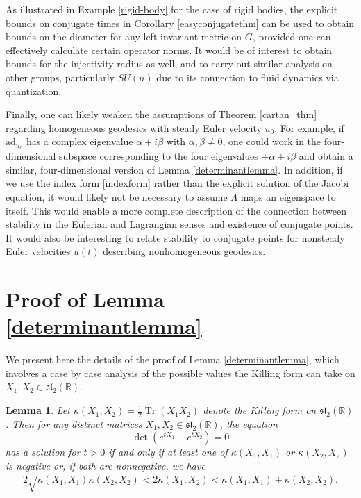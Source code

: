 \documentclass[oneside, 11pt]{amsart}
\newtheorem{lemma}[theorem]{Lemma}
\numberwithin{equation}{section}
\DeclareMathOperator{\Tr}{Tr}
\newcommand{\ad}{\mathrm{ad}}
\newcommand{\simpkill}{\kappa}
\newcommand{\mattyone}{X_1}
\newcommand{\mattytwo}{X_2}
\begin{document}
As illustrated in Example \ref{rigid-body} for the case of rigid bodies, the explicit bounds on conjugate times in Corollary \ref{easyconjugatethm} can be used to obtain bounds on the diameter for any left-invariant metric on $G$, provided one can effectively calculate certain operator norms. It would be of interest to obtain bounds for the injectivity radius as well, and to carry out similar analysis on other groups, particularly $SU(n)$ due to its connection to fluid dynamics via quantization.

Finally, one can likely weaken the assumptions of  Theorem \ref{cartan_thm} regarding homogeneous geodesics with steady Euler velocity $u_0$. For example, if $\ad_{u_0}$ has a complex eigenvalue $\alpha + i\beta$ with $\alpha, \beta \neq 0$, one could work in the four-dimensional subspace corresponding to the four eigenvalues $\pm \alpha \pm i\beta$ and obtain a similar, four-dimensional version of Lemma \ref{determinantlemma}. In addition, if we use the index form \eqref{indexform} rather than the explicit solution of the Jacobi equation, it would likely not be necessary to assume $\Lambda$ maps an eigenspace to itself. This would enable a more complete description of the connection between stability in the Eulerian and Lagrangian senses and existence of conjugate points. It would also be interesting to relate stability to conjugate points for nonsteady Euler velocities $u(t)$ describing nonhomogeneous geodesics.
   
    
  


 

\appendix
\section{Proof of Lemma \ref{determinantlemma}}

We present here the details of the proof of Lemma \ref{determinantlemma}, which involves a case by case analysis of the possible values the Killing form can take on $\mattyone,\mattytwo\in \mathfrak{sl}_2(\mathbb{R})$.

\begin{lemma} 
    Let $\simpkill(\mattyone,\mattytwo)=\tfrac{1}{2}\Tr(\mattyone\mattytwo)$ denote the Killing form on $\mathfrak{sl}_2(\mathbb{R})$. Then for any distinct matrices $\mattyone,\mattytwo\in\mathfrak{sl}_2(\mathbb{R})$, the equation $$\det{(e^{t\mattyone}-e^{t\mattytwo})} = 0$$
    has a solution for $t>0$ if and only if at least one of $\simpkill(\mattyone,\mattyone)$ or $\simpkill(\mattytwo,\mattytwo)$ is negative or, if both are nonnegative, we have
\begin{equation}\label{sl2conditionsecondtime}
2\sqrt{\simpkill(\mattyone,\mattyone)\simpkill(\mattytwo,\mattytwo)} < 2\simpkill(\mattyone,\mattytwo) < \simpkill(\mattyone,\mattyone)+\simpkill(\mattytwo,\mattytwo).
    \end{equation}
\end{lemma}
\end{document}
